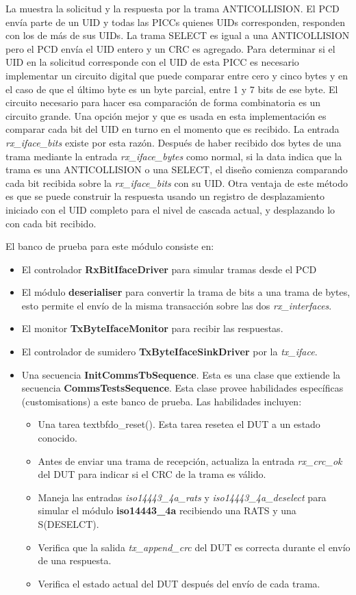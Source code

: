 \documentclass[a4paper, twoside, 11pt]{report}
\begin{document}
La  muestra la solicitud y la respuesta por la trama ANTICOLLISION. El PCD envía parte de un UID y todas las PICCs quienes UIDs corresponden, responden con los de más de sus UIDs. La trama SELECT es igual a una ANTICOLLISION pero el PCD envía el UID entero y un CRC es agregado. Para determinar si el UID en la solicitud corresponde con el UID de esta PICC es necesario implementar un circuito digital que puede comparar entre cero y cinco bytes y en el caso de que el último byte es un byte parcial, entre 1 y 7 bits de ese byte. El circuito necesario para hacer esa comparación de forma combinatoria es un circuito grande. Una opción mejor y que es usada en esta implementación es comparar cada bit del UID en turno en el momento que es recibido. La entrada \textit{rx\_iface\_bits} existe por esta razón. Después de haber recibido dos bytes de una trama mediante la entrada \textit{rx\_iface\_bytes} como normal, si la data indica que la trama es una ANTICOLLISION o una SELECT, el diseño comienza comparando cada bit recibida sobre la \textit{rx\_iface\_bits} con su UID. Otra ventaja de este método es que se puede construir la respuesta usando un registro de desplazamiento iniciado con el UID completo para el nivel de cascada actual, y desplazando lo con cada bit recibido.

El banco de prueba para este módulo consiste en:

\begin{itemize}
  \item El controlador \textbf{RxBitIfaceDriver} para simular tramas desde el PCD
  \item El módulo \textbf{deserialiser} para convertir la trama de bits a una trama de bytes, esto permite el envío de la misma transacción sobre las dos \textit{rx\_interfaces}.
  \item El monitor \textbf{TxByteIfaceMonitor} para recibir las respuestas.
  \item El controlador de sumidero \textbf{TxByteIfaceSinkDriver} por la \textit{tx\_iface}.
  \item Una secuencia \textbf{InitCommsTbSequence}. Esta es una clase que extiende la secuencia \textbf{CommsTestsSequence}. Esta clase provee habilidades específicas (customisations) a este banco de prueba. Las habilidades incluyen:
  \begin{itemize}[label=$\circ$]
    \item Una tarea textbf{do\_reset()}. Esta tarea resetea el DUT a un estado conocido.
    \item Antes de enviar una trama de recepción, actualiza la entrada \textit{rx\_crc\_ok} del DUT para indicar si el CRC de la trama es válido.
    \item Maneja las entradas \textit{iso14443\_4a\_rats} y \textit{iso14443\_4a\_deselect} para simular el módulo \textbf{iso14443\_4a} recibiendo una RATS y una S(DESELCT).
    \item Verifica que la salida \textit{tx\_append\_crc} del DUT es correcta durante el envío de una respuesta.
    \item Verifica el estado actual del DUT después del envío de cada trama.
  \end{itemize}
\end{itemize}
\end{document}
